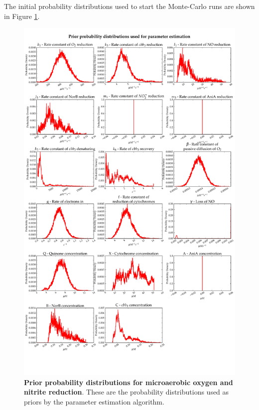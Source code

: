 The initial probability distributions used to start the Monte-Carlo runs are shown in Figure \ref{fig:nitrite_priors1}.

\begin{figure}[tbp]
 \centering
 \includegraphics[width=15cm, trim=0cm 4.1cm 0cm 1cm, clip=true]{./07-nitritereduction/data/priors1.pdf}
 \caption[Prior probability distributions for microaerobic oxygen and nitrite reduction]{{\bf Prior probability distributions for microaerobic oxygen and nitrite reduction}. These are the probability distributions used as priors by the parameter estimation algorithm.
 \label{fig:nitrite_priors1}}
\end{figure}
\afterpage{\clearpage}

